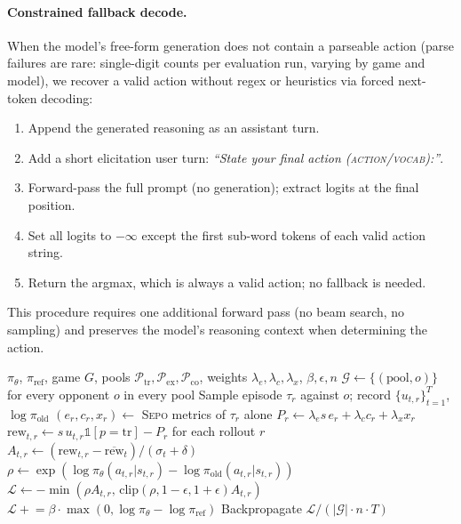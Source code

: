 \documentclass[letterpaper]{article} %
\newcommand{\sepo}{\textsc{Sepo}}
\begin{document}
\paragraph{Constrained fallback decode.} When the model's free-form generation does not contain a parseable action (parse failures are rare: single-digit counts per evaluation run, varying by game and model), we recover a valid action without regex or heuristics via forced next-token decoding:
\begin{enumerate}[noitemsep]
  \item Append the generated reasoning as an assistant turn.
  \item Add a short elicitation user turn: \textit{``State your final action (\textsc{action}/\textsc{vocab}):''}.
  \item Forward-pass the full prompt (no generation); extract logits at the final position.
  \item Set all logits to $-\infty$ except the first sub-word tokens of each valid action string.
  \item Return the argmax, which is always a valid action; no fallback is needed.
\end{enumerate}
This procedure requires one additional forward pass (no beam search, no sampling) and preserves the model's reasoning context when determining the action.
\begin{algorithm}[t]
\caption{\sepo{} Training Step}
\label{alg:sepo_grpo}
\begin{algorithmic}[1]
\Require $\pi_\theta$, $\pi_{\mathrm{ref}}$, game $G$, pools $\mathcal{P}_{\mathrm{tr}}, \mathcal{P}_{\mathrm{ex}}, \mathcal{P}_{\mathrm{co}}$, weights $\lambda_e, \lambda_c, \lambda_x$, $\beta, \epsilon, n$
\State $\mathcal{G} \leftarrow \{(\text{pool}, o)\}$ for every opponent $o$ in every pool 
    \State Sample episode $\tau_r$ against $o$; record $\{u_{t,r}\}_{t=1}^T$, $\log\pi_{\mathrm{old}}$
    \State $(e_r, c_r, x_r) \leftarrow$ \sepo{} metrics of $\tau_r$ alone
    \State $P_r \leftarrow \lambda_e s\, e_r + \lambda_c c_r + \lambda_x x_r$ 
  \EndFor
    \State $\text{rew}_{t,r} \leftarrow s\, u_{t,r}\mathbb{1}[p{=}\text{tr}] - P_r$ for each rollout $r$
    \State $A_{t,r} \leftarrow (\text{rew}_{t,r} - \overline{\text{rew}}_t) / (\sigma_t + \delta)$ 
      \State $\rho \leftarrow \exp(\log\pi_\theta(a_{t,r}|s_{t,r}) - \log\pi_{\mathrm{old}}(a_{t,r}|s_{t,r}))$
      \State $\mathcal{L} \leftarrow -\min(\rho A_{t,r},\, \mathrm{clip}(\rho, 1{-}\epsilon, 1{+}\epsilon) A_{t,r})$
      \State $\mathcal{L} \mathrel{+}= \beta \cdot \max(0, \log\pi_\theta - \log\pi_{\mathrm{ref}})$
      \State Backpropagate $\mathcal{L} / (|\mathcal{G}| \cdot n \cdot T)$
    \EndFor
  \EndFor
\EndFor
\end{algorithmic}
\end{algorithm}
\end{document}
